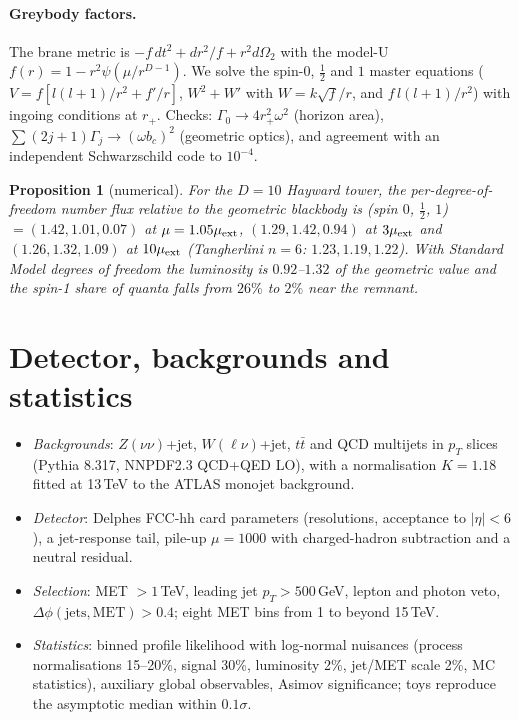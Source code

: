 \documentclass[11pt,a4paper]{article}
\newtheorem{proposition}{Proposition}
\begin{document}
\paragraph{Greybody factors.} The brane metric is $-f\,dt^2+dr^2/f+r^2d\Omega_2$ with the model-U $f(r)=1-r^2\psi(\mu/r^{D-1})$. We solve
the spin-$0$, $\tfrac12$ and $1$ master equations ($V=f[l(l+1)/r^2+f'/r]$, $W^2+W'$ with $W=k\sqrt f/r$, and $f\,l(l+1)/r^2$) with ingoing
conditions at $r_+$. Checks: $\Gamma_0\to4r_+^2\omega^2$ (horizon area), $\sum(2j+1)\Gamma_j\to(\omega b_c)^2$ (geometric optics), and
agreement with an independent Schwarzschild code to $10^{-4}$.
\begin{proposition}[numerical]
For the $D=10$ Hayward tower, the per-degree-of-freedom number flux relative to the geometric blackbody is (spin $0$, $\tfrac12$, $1$)
$=(1.42,1.01,0.07)$ at $\mu=1.05\mu_{\rm ext}$, $(1.29,1.42,0.94)$ at $3\mu_{\rm ext}$ and $(1.26,1.32,1.09)$ at $10\mu_{\rm ext}$
(Tangherlini $n=6$: $1.23,1.19,1.22$). With Standard Model degrees of freedom the luminosity is $0.92$--$1.32$ of the geometric value and
the spin-1 share of quanta falls from $26\%$ to $2\%$ near the remnant.
\end{proposition}

\section{Detector, backgrounds and statistics}
\begin{itemize}
\item \emph{Backgrounds}: $Z(\nu\nu)$+jet, $W(\ell\nu)$+jet, $t\bar t$ and QCD multijets in $p_T$ slices (Pythia 8.317, NNPDF2.3 QCD+QED
LO), with a normalisation $K=1.18$ fitted at 13\,TeV to the ATLAS monojet background.
\item \emph{Detector}: Delphes FCC-hh card parameters (resolutions, acceptance to $|\eta|<6$), a jet-response tail, pile-up $\mu=1000$
with charged-hadron subtraction and a neutral residual.
\item \emph{Selection}: MET $>1$\,TeV, leading jet $p_T>500$\,GeV, lepton and photon veto, $\Delta\phi(\text{jets},\text{MET})>0.4$;
eight MET bins from 1 to beyond 15\,TeV.
\item \emph{Statistics}: binned profile likelihood with log-normal nuisances (process normalisations 15--20\%, signal 30\%, luminosity 2\%,
jet/MET scale 2\%, MC statistics), auxiliary global observables, Asimov significance; toys reproduce the asymptotic median within
$0.1\sigma$.
\end{itemize}
\end{document}
